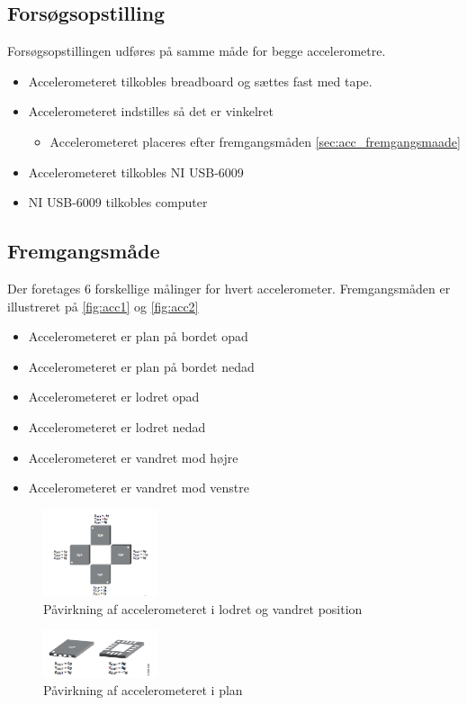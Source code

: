 \subsection{Forsøgsopstilling}
Forsøgsopstillingen udføres på samme måde for begge accelerometre.
\begin{itemize}
\item Accelerometeret tilkobles breadboard og sættes fast med tape.
\item Accelerometeret indstilles så det er vinkelret
\begin{itemize}
\item Accelerometeret placeres efter fremgangsmåden \autoref{sec:acc_fremgangsmaade}
\end{itemize}
\item Accelerometeret tilkobles NI USB-6009
\item NI USB-6009 tilkobles computer
\end{itemize}

\subsection{Fremgangsmåde} 
\label{sec:acc_fremgangsmaade}
Der foretages 6 forskellige målinger for hvert accelerometer. Fremgangsmåden er illustreret på \autoref{fig:acc1} og \autoref{fig:acc2}
\begin{itemize}
\item Accelerometeret er plan på bordet opad
\item Accelerometeret er plan på bordet nedad
\item Accelerometeret er lodret opad
\item Accelerometeret er lodret nedad
\item Accelerometeret er vandret mod højre
\item Accelerometeret er vandret mod venstre
\end{itemize}


\begin{figure}[H]
\centering
\includegraphics[width=0.3\textwidth]{figures/acc1}
\caption{Påvirkning af accelerometeret i lodret og vandret position \citep{analogdevices2010}}
\label{fig:acc1}
\end{figure}


\begin{figure}[H]
\centering
\includegraphics[width=0.3\textwidth]{figures/acc2}
\caption{Påvirkning af accelerometeret i plan \citep{analogdevices2010}}
\label{fig:acc2}
\end{figure}

